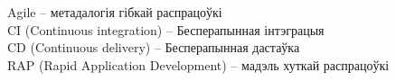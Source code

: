 \thispagestyle{empty}
\noindent%
Agile -- метадалогія гібкай распрацоўкі \\
CI (Continuous integration) -- Бесперапынная інтэграцыя \\
CD (Continuous delivery) -- Бесперапынная дастаўка \\
RAP (Rapid Application Development) -- мадэль хуткай распрацоўкі
\clearpage
